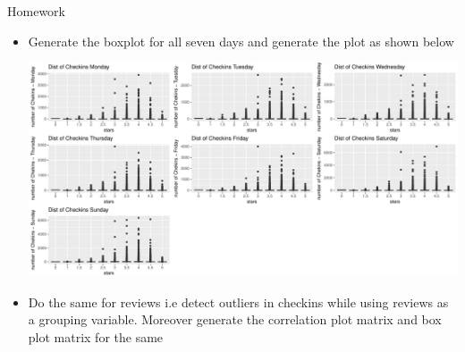 \documentclass[12pt]{book}\usepackage{knitr}
\begin{document}
\begin{DIY}{Homework}
  \begin{itemize}
  \item Generate the boxplot for all seven days and generate the plot as shown below
\begin{knitrout}
\color{fgcolor}
\includegraphics[width=\maxwidth]{figure/unnamed-chunk-44-1} 

\end{knitrout}
  \item Do the same for reviews i.e detect outliers in checkins while using reviews as a grouping variable. Moreover generate the correlation plot matrix and box plot matrix for the same
\end{itemize}
\end{DIY}
\end{document}
